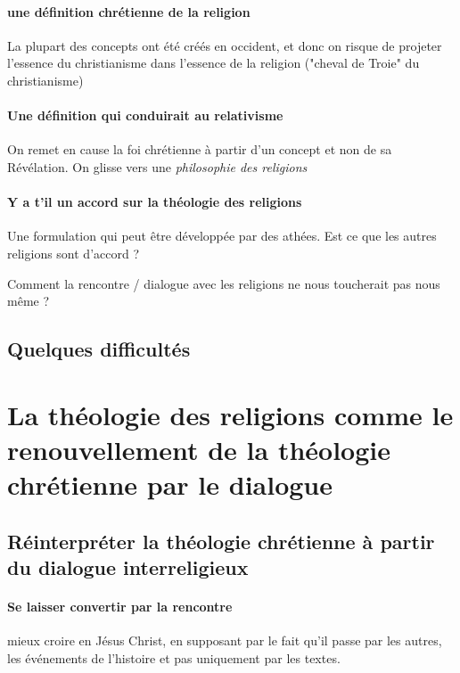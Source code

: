 \paragraph{une définition chrétienne de la religion} La plupart des concepts ont été créés en occident, et donc on risque de projeter l'essence du christianisme dans l'essence de la religion ("cheval de Troie" du christianisme) 

\paragraph{Une définition qui conduirait au relativisme} On remet en cause la foi chrétienne à partir d'un concept et non de sa Révélation. On glisse vers une \textit{philosophie des religions}

\paragraph{Y a t'il un accord sur la théologie des religions} Une formulation qui peut être développée par des athées. Est ce que les autres religions sont d'accord ?

\begin{Synthesis}
Comment la rencontre / dialogue avec les religions ne nous toucherait pas nous même ?
\end{Synthesis}




\subsection{Quelques difficultés}




\section{La théologie des religions comme le renouvellement de la théologie chrétienne
par le dialogue}
\subsection{Réinterpréter la théologie chrétienne à partir du dialogue interreligieux}


\paragraph{Se laisser convertir par la rencontre} mieux croire en Jésus Christ, en supposant par le fait qu'il passe par les autres, les événements de l'histoire et pas uniquement par les textes.

